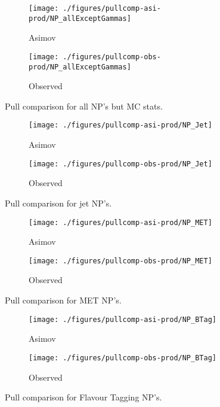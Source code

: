 \begin{figure}[!htbp]\captionsetup{justification=centering}\begin{subfigure}[t]{0.490000\textwidth}\centering\texttt{[image: ./figures/pullcomp-asi-prod/NP\_allExceptGammas]}\caption{Asimov}\end{subfigure}
\begin{subfigure}[t]{0.490000\textwidth}\centering\texttt{[image: ./figures/pullcomp-obs-prod/NP\_allExceptGammas]}\caption{Observed}\end{subfigure}
  \caption{Pull comparison for all NP's but MC stats.}
  \label{fig:PullComparisons-allExceptGammas}
\end{figure}

\begin{figure}[!htbp]\captionsetup{justification=centering}\begin{subfigure}[t]{0.490000\textwidth}\centering\texttt{[image: ./figures/pullcomp-asi-prod/NP\_Jet]}\caption{Asimov}\end{subfigure}
\begin{subfigure}[t]{0.490000\textwidth}\centering\texttt{[image: ./figures/pullcomp-obs-prod/NP\_Jet]}\caption{Observed}\end{subfigure}
  \caption{Pull comparison for jet NP's.}
  \label{fig:PullComparisons-Jet}
\end{figure}

\begin{figure}[!htbp]\captionsetup{justification=centering}\begin{subfigure}[t]{0.490000\textwidth}\centering\texttt{[image: ./figures/pullcomp-asi-prod/NP\_MET]}\caption{Asimov}\end{subfigure}
\begin{subfigure}[t]{0.490000\textwidth}\centering\texttt{[image: ./figures/pullcomp-obs-prod/NP\_MET]}\caption{Observed}\end{subfigure}
  \caption{Pull comparison for MET NP's.}
  \label{fig:PullComparisons-MET}
\end{figure}

\begin{figure}[!htbp]\captionsetup{justification=centering}\begin{subfigure}[t]{0.490000\textwidth}\centering\texttt{[image: ./figures/pullcomp-asi-prod/NP\_BTag]}\caption{Asimov}\end{subfigure}
\begin{subfigure}[t]{0.490000\textwidth}\centering\texttt{[image: ./figures/pullcomp-obs-prod/NP\_BTag]}\caption{Observed}\end{subfigure}
  \caption{Pull comparison for Flavour Tagging NP's.}
  \label{fig:PullComparisons-BTag}
\end{figure}

